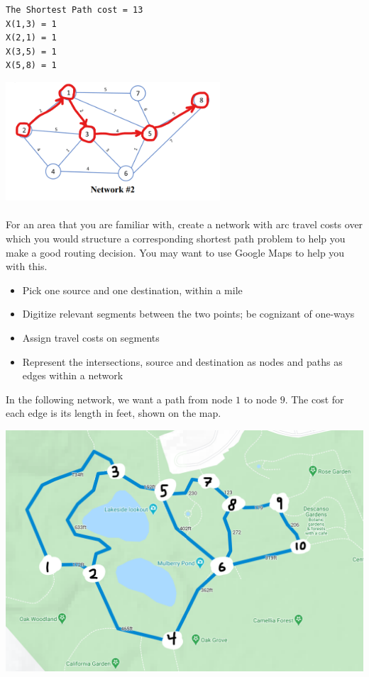 \documentclass[12pt]{article}
\newenvironment{fullbox}{\begin{lrbox}{\savefullbox}\begin{minipage}{\dimexpr\textwidth-2\fboxsep\relax}}{\end{minipage}\end{lrbox}\begin{center}\framebox[\textwidth]{\usebox{\savefullbox}}\end{center}}
\newenvironment{pbox}[1][]{\begin{fullbox}\ifx#1\empty\else\paragraph{#1}\fi}{\end{fullbox}}
\theoremstyle{definition}
\begin{document}
\begin{verbatim}
The Shortest Path cost = 13
X(1,3) = 1
X(2,1) = 1
X(3,5) = 1
X(5,8) = 1
\end{verbatim}

\begin{center}
    \includegraphics[width=0.6\textwidth]{sol4.png}
\end{center}



\newpage
\begin{pbox}
    For an area that you are familiar with, create a network with arc travel costs over which you
    would structure a corresponding shortest path problem to help you make a good routing decision.
    You may want to use Google Maps to help you with this.
    \begin{itemize}
        \item Pick one source and one destination, within a mile
        \item Digitize relevant segments between the two points; be cognizant of one-ways
        \item Assign travel costs on segments
        \item Represent the intersections, source and destination as nodes and paths as edges within a network
    \end{itemize}
\end{pbox}

In the following network, we want a path from node $1$ to node $9$. The cost for each edge is its length in feet, shown on the map.

\begin{center}
    \includegraphics[width=\textwidth]{googlemap.png}
\end{center}
\end{document}
